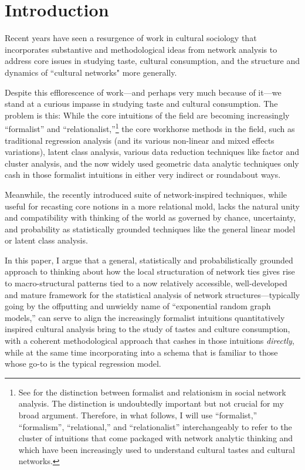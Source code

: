 \documentclass[preprint,12pt,authoryear]{elsarticle}
\begin{document}

\section{Introduction}
\label{sec:intro}
Recent years have seen a resurgence of work in cultural sociology that incorporates substantive and methodological ideas from network analysis to address core issues in studying taste, cultural consumption, and the structure and dynamics of ``cultural networks" more generally.

Despite this efflorescence of work---and perhaps very much because of it---we stand at a curious impasse in studying taste and cultural consumption. The problem is this: While the core intuitions of the field are becoming increasingly ``formalist'' and ``relationalist,''\footnote{See \citet{erikson2013formalist} for the distinction between formalist and relationism in social network analysis. The distinction is undoubtedly important but not crucial for my broad argument. Therefore, in what follows, I will use ``formalist,'' ``formalism'', ``relational,'' and ``relationalist'' interchangeably to refer to the cluster of intuitions that come packaged with network analytic thinking and which have been increasingly used to understand cultural tastes and cultural networks.} the core workhorse methods in the field, such as traditional regression analysis (and its various non-linear and mixed effects variations), latent class analysis, various data reduction techniques like factor and cluster analysis, and the now widely used geometric data analytic techniques only cash in those formalist intuitions in either very indirect or roundabout ways. 

Meanwhile, the recently introduced suite of network-inspired techniques, while useful for recasting core notions in a more relational mold, lacks the natural unity and compatibility with thinking of the world as governed by chance, uncertainty, and probability as statistically grounded techniques like the general linear model or latent class analysis. 

In this paper, I argue that a general, statistically and probabilistically grounded approach to thinking about how the local structuration of network ties gives rise to macro-structural patterns tied to a now relatively accessible, well-developed and mature framework for the statistical analysis of network structures---typically going by the offputting and unwieldy name of ``exponential random graph models,'' can serve to align the increasingly formalist intuitions quantitatively inspired cultural analysis bring to the study of tastes and culture consumption, with a coherent methodological approach that cashes in those intuitions \textit{directly}, while at the same time incorporating into a schema that is familiar to those whose go-to is the typical regression model. 
\end{document}
